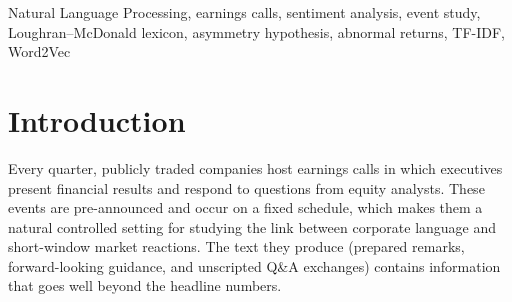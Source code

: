 \documentclass[conference]{IEEEtran}
\begin{document}
\begin{abstract}
Earnings calls are pre-announced corporate events that produce rich unstructured
text containing tone and sentiment information beyond what headline financial
metrics capture. This paper tests the \emph{asymmetry hypothesis}: that negative
language is a disproportionately stronger predictor of short-window Cumulative
Abnormal Returns (CAR) than positive language, consistent with investor loss aversion.
We build a corpus of 620 earnings call transcripts from 19 technology-sector
firms spanning 2007--2025 and pair each transcript with event-study CAR targets
derived from an OLS market model. Sentiment features are extracted using the
Loughran--McDonald financial lexicon, TF-IDF bag-of-words, and Word2Vec
document embeddings. A Wald test rejects the symmetry null at the 5\% level
($p = 0.042$) in the LM + controls specification, with $\hat\beta_{\text{neg}} = -8.92$
versus $\hat\beta_{\text{pos}} = +3.31$, a 2.7$\times$ asymmetry ratio. The
effect is concentrated in the Q\&A section, where management language is least
scripted. The LM lexicon achieves the best out-of-sample $R^2$ (+0.057),
outperforming TF-IDF and Word2Vec despite its simplicity. These results confirm
that domain-adapted sentiment features carry genuine predictive information over
market baselines.
\end{abstract}

\begin{IEEEkeywords}
Natural Language Processing, earnings calls, sentiment analysis, event study,
Loughran--McDonald lexicon, asymmetry hypothesis, abnormal returns, TF-IDF, Word2Vec
\end{IEEEkeywords}

\section{Introduction}
\label{sec:intro}

Every quarter, publicly traded companies host earnings calls in which executives
present financial results and respond to questions from equity analysts.
These events are pre-announced and occur on a fixed schedule, which makes them
a natural controlled setting for studying the link between corporate language
and short-window market reactions. The text they produce (prepared remarks,
forward-looking guidance, and unscripted Q\&A exchanges) contains information
that goes well beyond the headline numbers.
\end{document}
